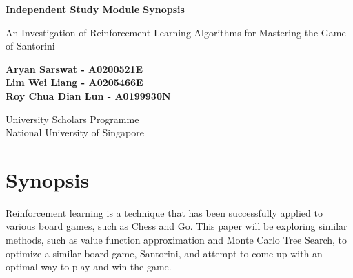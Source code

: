 \documentclass[a4paper,12pt,table]{article}
\begin{document}
    
\begin{titlepage}
    \begin{center}
        \vspace*{6cm}
 
        \textbf{{\Huge Independent Study Module Synopsis}}
 
     \vspace{5cm}
 
  {\Large An Investigation of Reinforcement Learning Algorithms for Mastering the Game of Santorini}
 
        \vspace{0.5cm}
 
        \vspace{1.5cm}
 
 
        \vfill
 
 
 
        \textbf{Aryan Sarswat -  A0200521E \\
         Lim Wei Liang - A0205466E \\
         Roy Chua Dian Lun - A0199930N \\ }
 
        \vspace{0.8cm}
 
       University Scholars Programme\\
        National University of Singapore\\
 
    \end{center}
 \end{titlepage}

 \newpage

\section{Synopsis}

Reinforcement learning is a technique that has been successfully applied to various board games, such as Chess and Go. This paper will be exploring similar methods, such as value function approximation and Monte Carlo Tree Search, to optimize a similar board game, Santorini, and attempt to come up with an optimal way to play and win the game. \par
\end{document}
